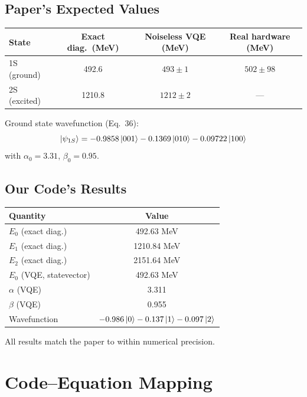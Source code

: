 \documentclass[11pt,a4paper]{article}
\begin{document}
\subsection{Paper's Expected Values}

\begin{center}
\begin{tabular}{lccc}
\toprule
State & Exact diag.\ (MeV) & Noiseless VQE (MeV) & Real hardware (MeV) \\
\midrule
1S (ground) & 492.6 & $493 \pm 1$ & $502 \pm 98$ \\
2S (excited) & 1210.8 & $1212 \pm 2$ & --- \\
\bottomrule
\end{tabular}
\end{center}

Ground state wavefunction (Eq.~36):
\begin{equation}
  \ket{\psi_{1S}} = -0.9858\ket{001} - 0.1369\ket{010} - 0.09722\ket{100}
\end{equation}
with $\alpha_0 = 3.31$, $\beta_0 = 0.95$.

\subsection{Our Code's Results}

\begin{center}
\begin{tabular}{lc}
\toprule
Quantity & Value \\
\midrule
$E_0$ (exact diag.) & 492.63 MeV \\
$E_1$ (exact diag.) & 1210.84 MeV \\
$E_2$ (exact diag.) & 2151.64 MeV \\
$E_0$ (VQE, statevector) & 492.63 MeV \\
$\alpha$ (VQE) & 3.311 \\
$\beta$ (VQE) & 0.955 \\
Wavefunction & $-0.986\ket{0} - 0.137\ket{1} - 0.097\ket{2}$ \\
\bottomrule
\end{tabular}
\end{center}

All results match the paper to within numerical precision.

\section{Code--Equation Mapping}
\end{document}
